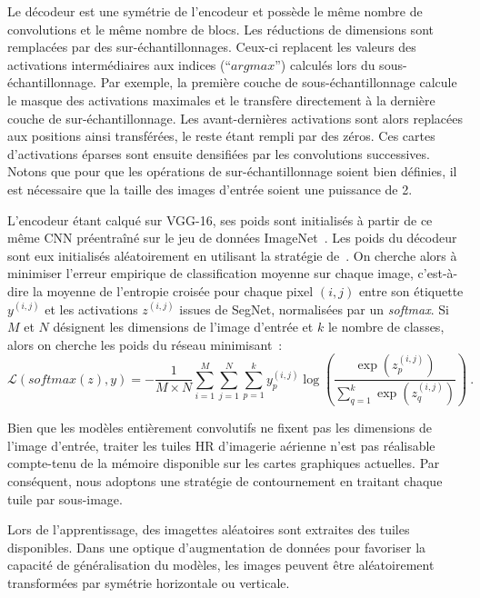 Le décodeur est une symétrie de l'encodeur et possède le même nombre de convolutions et le même nombre de blocs. Les réductions de dimensions sont remplacées par des sur-échantillonnages. Ceux-ci replacent les valeurs des activations intermédiaires aux indices (``$argmax$'') calculés lors du sous-échantillonnage. Par exemple, la première couche de sous-échantillonnage calcule le masque des activations maximales et le transfère directement à la dernière couche de sur-échantillonnage. Les avant-dernières activations sont alors replacées aux positions ainsi transférées, le reste étant rempli par des zéros. Ces cartes d'activations éparses sont ensuite densifiées par les convolutions successives. Notons que pour que les opérations de sur-échantillonnage soient bien définies, il est nécessaire que la taille des images d'entrée soient une puissance de 2.

L'encodeur étant calqué sur VGG-16, ses poids sont initialisés à partir de ce même CNN préentraîné sur le jeu de données ImageNet~\cite{deng_imagenet_2009}. Les poids du décodeur sont eux initialisés aléatoirement en utilisant la stratégie de~\citet{he_delving_2015}. On cherche alors à minimiser l'erreur empirique de classification moyenne sur chaque image, c'est-à-dire la moyenne de l'entropie croisée pour chaque pixel $(i,j)$ entre son étiquette $y^{(i,j)}$ et les activations $z^{(i,j)}$ issues de SegNet, normalisées par un \emph{softmax}. Si $M$ et $N$ désignent les dimensions de l'image d'entrée et $k$ le nombre de classes, alors on cherche les poids du réseau minimisant~:
\begin{equation}
\mathcal{L}(\mathit{softmax}(z),y) = - \frac{1}{M \times N} \sum_{i=1}^M \sum_{j=1}^N \sum_{p=1}^k y_p^{(i,j)} \log\left(\frac{\exp(z_p^{(i,j)})}{\sum\limits_{q=1}^k \exp(z_q^{(i,j)})}\right)~.
\end{equation}


Bien que les modèles entièrement convolutifs ne fixent pas les dimensions de l'image d'entrée, traiter les tuiles \gls{HR} d'imagerie aérienne n'est pas réalisable compte-tenu de la mémoire disponible sur les cartes graphiques actuelles. Par conséquent, nous adoptons une stratégie de contournement en traitant chaque tuile par sous-image.

Lors de l'apprentissage, des imagettes aléatoires sont extraites des tuiles disponibles. Dans une optique d'augmentation de données pour favoriser la capacité de généralisation du modèles, les images peuvent être aléatoirement transformées par symétrie horizontale ou verticale.

